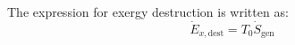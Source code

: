 The expression for exergy destruction is written as:  
\[
\dot{E}_{x,\text{dest}} = T_0 \dot{S}_{\text{gen}}
\]
